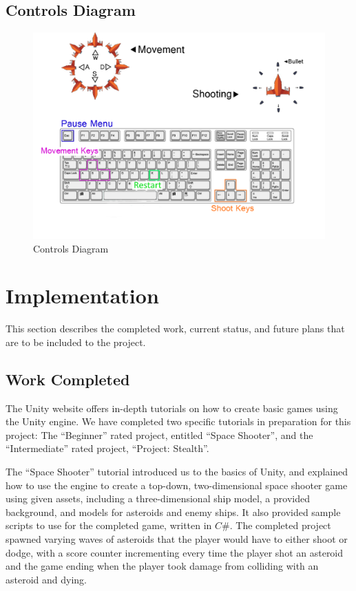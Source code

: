 \documentclass[12pt]{article}       %
\def\hs{\hspace{15pt}}
\begin{document}
\subsection{Controls Diagram}

\begin{figure} [H]
\centering
\includegraphics[width=6.3 in]{ControlDiagramFinal.png}
\caption{Controls Diagram} \label{Controls}
\end{figure}


\section{Implementation} %
\label{sec:history}
This section describes the completed work, current status, and future plans that are to be included to the project.

\subsection{Work Completed}

\hs The Unity website offers in-depth tutorials on how to create basic games using the Unity engine. We have completed two specific tutorials in preparation for this project: The “Beginner” rated project, entitled “Space Shooter”, and the “Intermediate” rated project, “Project: Stealth”.

  The “Space Shooter” tutorial introduced us to the basics of Unity, and explained how to use the engine to create a top-down, two-dimensional space shooter game using given assets, including a three-dimensional ship model, a provided background, and models for asteroids and enemy ships. It also provided sample scripts to use for the completed game, written in $C\#$. The completed project spawned varying waves of asteroids that the player would have to either shoot or dodge, with a score counter incrementing every time the player shot an asteroid and the game ending when the player took damage from colliding with an asteroid and dying.
\end{document}
